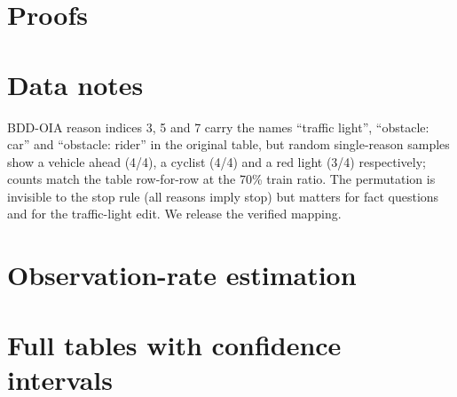 \section{Proofs}\label{app:proofs}

\section{Data notes}\label{app:data}
BDD-OIA reason indices 3, 5 and 7 carry the names ``traffic light'', ``obstacle: car'' and ``obstacle: rider'' in the original table, but random single-reason samples show a vehicle ahead (4/4), a cyclist (4/4) and a red light (3/4) respectively; counts match the table row-for-row at the 70\% train ratio. The permutation is invisible to the stop rule (all reasons imply stop) but matters for fact questions and for the traffic-light edit. We release the verified mapping.

\section{Observation-rate estimation}\label{app:em}

\section{Full tables with confidence intervals}\label{app:tables}
